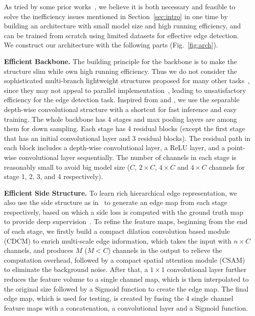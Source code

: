 \documentclass[10pt,twocolumn,letterpaper]{article}
\begin{document}
As tried by some prior works~\cite{wibisono2020fined,poma2020dense,wibisono2020traditional}, we believe it is both necessary and feasible to solve the inefficiency issues mentioned in Section~\ref{sec:intro} in one time by building an architecture with small model size and high running efficiency, and can be trained from scratch using limited datasets for effective edge detection. We construct our architecture with the following parts (Fig.~\ref{fig:arch}).

\vspace{0.3em}
\noindent \textbf{Efficient Backbone.} \quad The building principle for the backbone is to make the structure slim while own high running efficiency. Thus we do not consider the sophisticated multi-branch lightweight structures proposed for many other tasks~\cite{gao2020100k,mehta2019espnetv2,yu2018bisenet}, since they may not appeal to parallel implementation~\cite{ma2018shufflenetv2}, leading to unsatisfactory efficiency for the edge detection task. Inspired from \cite{he2016residual} and \cite{howard2017mobilenets}, we use the separable depth-wise convolutional structure with a shortcut for fast inference and easy training. The whole backbone has 4 stages and max pooling layers are among them for down sampling. Each stage has 4 residual blocks (except the first stage that has an initial convolutional layer and 3 residual blocks). The residual path in each block includes a depth-wise convolutional layer, a ReLU layer, and a point-wise convolutional layer sequentially. The number of channels in each stage is reasonably small to avoid big model size ($C$, $2\times C$, $4\times C$ and $4\times C$ channels for stage 1, 2, 3, and 4 respectively).

\vspace{0.3em}
\noindent \textbf{Efficient Side Structure.} \quad To learn rich hierarchical edge representation, we also use the side structure as in~\cite{xie2017holistically} to generate an edge map from each stage respectively, based on which a side loss is computed with the ground truth map to provide deep supervision~\cite{xie2017holistically}. To refine the feature maps, beginning from the end of each stage, we firstly build a compact dilation convolution based module (CDCM) to enrich multi-scale edge information, which takes the input with $n\times C$ channels, and produces $M$ ($M < C$) channels in the output to relieve the computation overhead, followed by a compact spatial attention module (CSAM) to eliminate the background noise. After that, a $1\times 1$ convolutional layer further reduces the feature volume to a single channel map, which is then interpolated to the original size followed by a Sigmoid function to create the edge map. The final edge map, which is used for testing, is created by fusing the 4 single channel feature maps with a concatenation, a convolutional layer and a Sigmoid function. 
\end{document}
